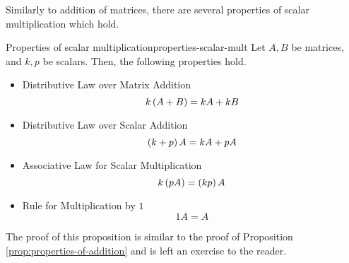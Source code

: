 Similarly to addition of matrices, there are several properties of scalar multiplication which hold.

\begin{proposition}{Properties of scalar multiplication}{properties-scalar-mult}
Let $A, B$ be matrices, and $k, p$ be scalars. Then, the following properties hold.
\begin{itemize}
\item Distributive Law over Matrix Addition
\begin{equation*}
k \left(A+B\right) =k A+ kB  
\end{equation*}

\item Distributive Law over Scalar Addition
\begin{equation*}
\left(k +p \right) A= k A+p A
\end{equation*}

\item Associative Law for Scalar Multiplication
\begin{equation*}
k \left(p A\right) = \left(k p \right) A 
\end{equation*}

\item Rule for Multiplication by $1$
\begin{equation*}
1A=A  
\end{equation*}
\end{itemize}

\end{proposition}

The proof of this proposition is similar to the proof of Proposition \ref{prop:properties-of-addition} and is left an exercise to the reader.
